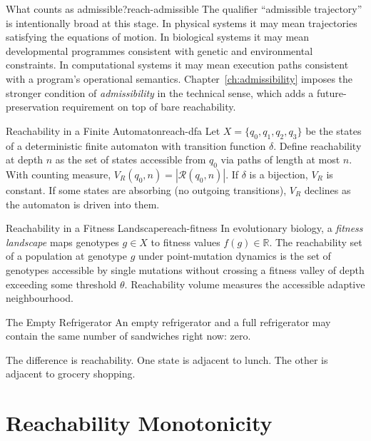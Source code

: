 \documentclass[12pt,twoside,openright]{book}
\newcommand{\csicon} {\marginpar{\tiny\color{DistBlue}\faCode}}
\newcommand{\bioicon}{\marginpar{\tiny\color{DistTeal}\faDna}}
\newcommand{\reach}{\mathcal{R}}
\begin{document}
\begin{remark}{What counts as admissible?}{reach-admissible}
  The qualifier ``admissible trajectory'' is intentionally
  broad at this stage. In physical systems it may mean
  trajectories satisfying the equations of motion. In
  biological systems it may mean developmental programmes
  consistent with genetic and environmental constraints. In
  computational systems it may mean execution paths
  consistent with a program's operational semantics.
  Chapter~\ref{ch:admissibility} imposes the stronger
  condition of \emph{admissibility} in the technical sense,
  which adds a future-preservation requirement on top of
  bare reachability.
\end{remark}

\begin{example}{Reachability in a Finite Automaton}{reach-dfa}
  \csicon
  Let $X = \{q_0,q_1,q_2,q_3\}$ be the states of a
  deterministic finite automaton with transition function
  $\delta$. Define reachability at depth $n$ as the set of
  states accessible from $q_0$ via paths of length at most
  $n$. With counting measure, $V_R(q_0,n) = |\reach(q_0,n)|$.
  If $\delta$ is a bijection, $V_R$ is constant. If some
  states are absorbing (no outgoing transitions), $V_R$
  declines as the automaton is driven into them.
\end{example}

\begin{example}{Reachability in a Fitness Landscape}{reach-fitness}
  \bioicon
  In evolutionary biology, a \emph{fitness landscape} maps
  genotypes $g\in X$ to fitness values $f(g)\in\mathbb{R}$.
  The reachability set of a population at genotype $g$
  under point-mutation dynamics is the set of genotypes
  accessible by single mutations without crossing a fitness
  valley of depth exceeding some threshold $\theta$.
  Reachability volume measures the accessible adaptive
  neighbourhood.
\end{example}

\begin{distinctionaside}{The Empty Refrigerator}
An empty refrigerator and a full refrigerator may contain
the same number of sandwiches right now: zero.

The difference is reachability. One state is adjacent to
lunch. The other is adjacent to grocery shopping.
\end{distinctionaside}

\section{Reachability Monotonicity}
\label{sec:ch13-monotone}
\end{document}
